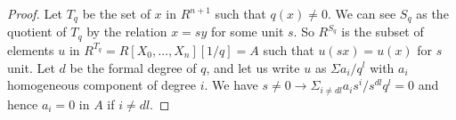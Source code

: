  \begin{proof}
   Let $T_q$ be the set of $x$ in $R^{n+1}$ such that $q(x) \neq 0$. We can see $S_q$ as the quotient of $T_q$
   by the relation $x = sy$ for some unit $s$. So $R^{S_q}$ is the subset of elements $u$ in $R^{T_q} = R[X_0,\dots,X_n][1/q] = A$
   such that $u(sx) = u(x)$ for $s$ unit. Let $d$ be the formal degree of $q$, and let us write $u$ as $\Sigma a_i/q^l$ with
   $a_i$ homogeneous component of degree $i$. We have $s\neq 0\rightarrow \Sigma_{i\neq dl} a_is^i/s^{dl}q^l = 0$ and hence
   $a_i = 0$ in $A$ if $i\neq dl$.
 \end{proof}
 
